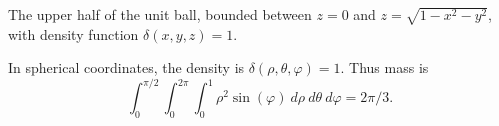 {
The upper half of the unit ball, bounded between $z= 0$ and $z=\sqrt{1-x^2-y^2}$, with density function $\delta(x,y,z) =1$.
\label{ex:13_07_ex_31} 
}
{In spherical coordinates, the density is $\delta(\rho,\theta,\varphi) = 1$. Thus mass is
$$\int_0^{\pi/2}\int_0^{2\pi}\int_{0}^{1} \rho^2\sin(\varphi)\ d\rho\ d\theta\ d\varphi = 2\pi/3.$$

}
